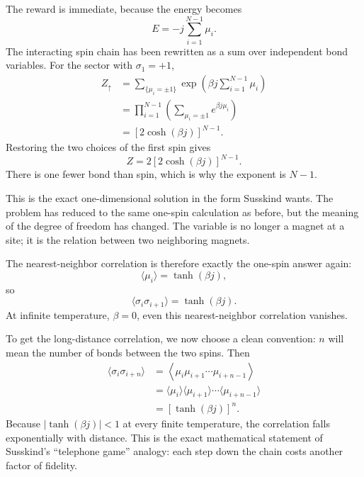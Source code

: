 The reward is immediate, because the energy becomes
\begin{equation}
E=-j\sum_{i=1}^{N-1}\mu_i.
\end{equation}
The interacting spin chain has been rewritten as a sum over independent bond variables. For the sector with \(\sigma_1=+1\),
\begin{align}
Z_{\uparrow}
&=\sum_{\{\mu_i=\pm1\}}
\exp\!\left(\beta j\sum_{i=1}^{N-1}\mu_i\right) \\
&=\prod_{i=1}^{N-1}\left(\sum_{\mu_i=\pm1} e^{\beta j\mu_i}\right) \\
&=[2\cosh(\beta j)]^{N-1}.
\end{align}
Restoring the two choices of the first spin gives
\begin{equation}
Z=2[2\cosh(\beta j)]^{N-1}.
\end{equation}
There is one fewer bond than spin, which is why the exponent is \(N-1\).

This is the exact one-dimensional solution in the form Susskind wants. The problem has reduced to the same one-spin calculation as before, but the meaning of the degree of freedom has changed. The variable is no longer a magnet at a site; it is the relation between two neighboring magnets.

The nearest-neighbor correlation is therefore exactly the one-spin answer again:
\begin{equation}
\langle \mu_i\rangle=\tanh(\beta j),
\end{equation}
so
\begin{equation}
\langle \sigma_i\sigma_{i+1}\rangle=\tanh(\beta j).
\end{equation}
At infinite temperature, \(\beta=0\), even this nearest-neighbor correlation vanishes.

To get the long-distance correlation, we now choose a clean convention: \(n\) will mean the number of bonds between the two spins. Then
\begin{align}
\langle \sigma_i\sigma_{i+n}\rangle
&=\left\langle \mu_i\mu_{i+1}\cdots\mu_{i+n-1}\right\rangle \\
&=\langle \mu_i\rangle \langle \mu_{i+1}\rangle \cdots \langle \mu_{i+n-1}\rangle \\
&=[\tanh(\beta j)]^n.
\end{align}
Because \(|\tanh(\beta j)|<1\) at every finite temperature, the correlation falls exponentially with distance. This is the exact mathematical statement of Susskind's ``telephone game'' analogy: each step down the chain costs another factor of fidelity.

